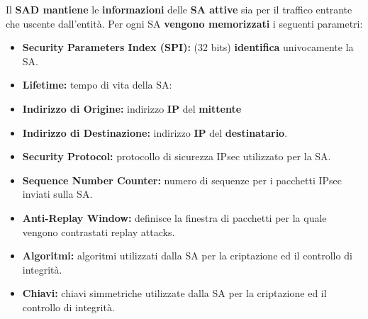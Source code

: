 \begin{definition}\label{def:sad}
Il \textbf{SAD mantiene} le \textbf{informazioni} delle \textbf{SA attive} sia per il traffico entrante che uscente dall’entità. Per ogni SA \textbf{vengono memorizzati} i seguenti parametri:
\begin{itemize}
    \item \textbf{Security Parameters Index (SPI):} (32 bits) \textbf{identifica} univocamente la SA.
    \item \textbf{Lifetime:} tempo di vita della SA:
    \item \textbf{Indirizzo di Origine:} indirizzo \textbf{IP} del \textbf{mittente}
    \item \textbf{Indirizzo di Destinazione:} indirizzo \textbf{IP} del \textbf{destinatario}.
    \item \textbf{Security Protocol:} protocollo di sicurezza IPsec utilizzato per la SA.
    \item \textbf{Sequence Number Counter:} numero di sequenze per i pacchetti IPsec inviati sulla SA.
    \item \textbf{Anti-Replay Window:} definisce la finestra di pacchetti per la quale vengono contrastati replay attacks.
    \item \textbf{Algoritmi:} algoritmi utilizzati dalla SA per la criptazione ed il controllo di integrità.
    \item \textbf{Chiavi:} chiavi simmetriche utilizzate dalla SA per la criptazione ed il controllo di integrità.
\end{itemize}
\end{definition}

